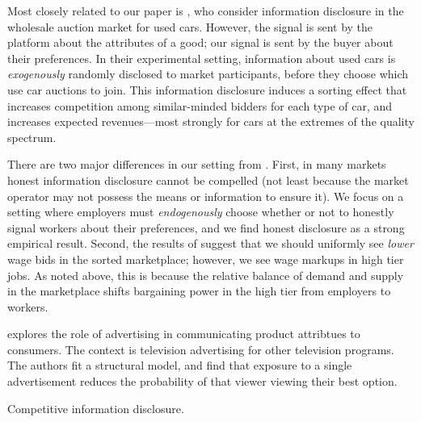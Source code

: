 Most closely related to our paper is \cite{tadelis2011information}, who consider information disclosure in the wholesale auction market for used cars.
However, the signal is sent by the platform about the attributes of a good;
our signal is sent by the buyer about their preferences. 
In their experimental setting, information about used cars is {\em exogenously} randomly disclosed to market participants, before they choose which use car auctions to join.
This information disclosure induces a sorting effect that increases competition among similar-minded bidders for each type of car, and increases expected revenues---most strongly for cars at the extremes of the quality spectrum.

There are two major differences in our setting from \cite{tadelis2011information}.
First, in many markets honest information disclosure cannot be compelled (not least because the market operator may not possess the means or information to ensure it).
We focus on a setting where employers must {\em endogenously} choose whether or not to honestly signal workers about their preferences, and we find honest disclosure as a strong empirical result.
Second, the results of \cite{tadelis2011information} suggest that we should uniformly see {\em lower} wage bids in the sorted marketplace; however, we see wage markups in high tier jobs. 
As noted above, this is because the relative balance of demand and supply in the marketplace shifts bargaining power in the high tier from employers to workers. 

\cite{tadelis2011information}

\cite{anand2011} explores the role of advertising in communicating product attribtues to consumers. 
The context is television advertising for other television programs.
The authors fit a structural model, and find that exposure to a single advertisement reduces the probability of that viewer viewing their best option. 

Competitive information disclosure.
\cite{board2015competitive}

\cite{board2009}

\cite{budish2011}
\cite{cho2014}
\cite{day1976}
\cite{Silva2008}
\cite{Diamond1991}
\cite{Genesove1993}
\cite{gilson1984}
\cite{grossman1981}
\cite{healy2001}
\cite{jin2003}
\cite{johnson2006}
\cite{levin1996}
\cite{lewis2011}
\cite{milgrom1981}
\cite{Milgrom1982}
\cite{overby2009}
\cite{porter1995}
\cite{roberts2014}

\cite{coles2009signaling}
\cite{lee2009interviewing}
\cite{ely2009hiring}
\cite{ely2013adverse}
\cite{lee2011propose}
\cite{kushnir2013harmful}
